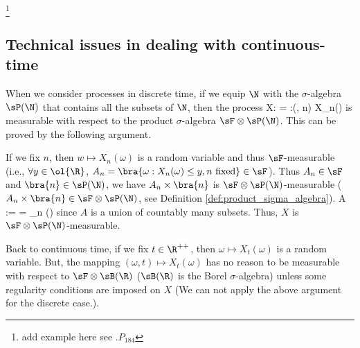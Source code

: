 \footnote{add example here see \cite{Rogers_1994}.$P_{184}$}



\subsection{Technical issues in dealing with continuous-time}

When we consider processes in discrete time, if we equip $\N$ with the $\sigma$-algebra $\sP(\N)$ that contains all the subsets of $\N$, then the process
\be
X:\Omega \times\N\to \ol{\R} = \R\cup \bra{\pm \infty}:(\omega, n) \mapsto X_n(\omega)
\ee
is measurable with respect to the product $\sigma$-algebra $\sF\otimes \sP(\N)$. This can be proved by the following argument.

If we fix $n$, then $w\mapsto X_n(\omega)$ is a random variable and thus $\sF$-measurable (i.e., $\forall y\in \ol{\R}$, $A_n = \bra{\omega:X_n(\omega) \leq y, n\text{ fixed}} \in \sF$). Thus $A_n \in \sF$ and $\bra{n} \in \sP(\N)$, we have $A_n\times \bra{n}$ is $\sF\otimes \sP(\N)$-measurable ($A_n\times \bra{n} \in \sF\otimes \sP(\N)$, see Definition \ref{def:product_sigma_algebra}). %
\be
A :=  = \bigcup_{n} \in  \sF\otimes \sP(\N)
\ee
since $A$ is a union of countably many subsets. Thus, $X$ is $\sF\otimes \sP(\N)$-measurable.




Back to continuous time, if we fix $t \in\R^{++}$, then $\omega \mapsto X_t(\omega)$ is a random variable. But, the mapping $(\omega,t) \mapsto X_t(\omega)$ has no reason to be measurable with respect to $\sF \otimes \sB(\R)$ ($\sB(\R)$ is the Borel $\sigma$-algebra) unless some regularity conditions are imposed on $X$ (We can not apply the above argument for the discrete case.).

